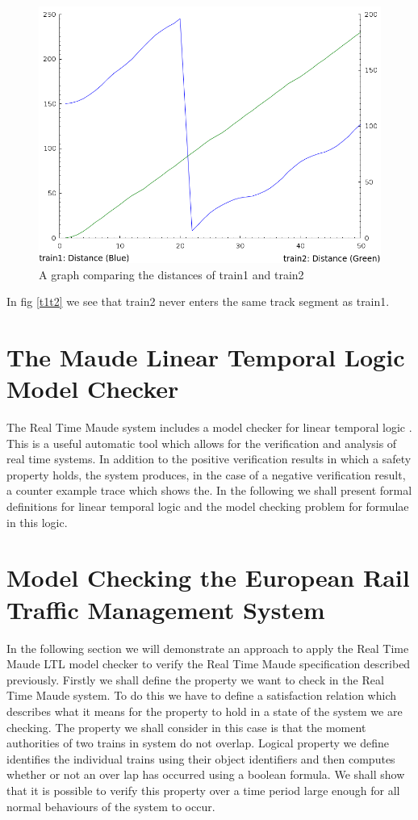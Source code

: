 \begin{figure}
\label{t1t2graph}
\begin{center}
\includegraphics[scale=0.64]{t1t2graph.png}
\end{center}
\caption{A graph comparing the distances of train1 and train2}
\end{figure}

In fig \ref{t1t2} we see that train2 never enters the same track segment as train1.

\section{The Maude Linear Temporal Logic Model Checker}
The Real Time Maude system includes a model checker for linear temporal logic \cite{ES00}.  This is a useful automatic tool which allows for the verification and analysis of real time systems. In addition to the positive verification results in which a safety property holds,  the system produces, in the case of a negative verification result, a counter example trace which shows the. In the following we shall present formal definitions for linear temporal logic and the model checking problem for formulae in this logic.

 

\section{Model Checking the European Rail Traffic Management System}
In the following section we will demonstrate an approach to apply the Real Time Maude LTL model checker to verify the Real Time Maude specification described previously.
Firstly we shall define the property we want to check in the Real Time Maude system. To do this we have to define a satisfaction relation which describes what it means for the property to hold in a state of the system we are checking.  The property we shall consider in this case is that the moment authorities of two trains in system do not overlap. Logical property we define identifies the individual trains using their object identifiers and then computes whether or not an over lap has occurred using a boolean formula.  We shall show that it is possible to verify this property over a time period large enough for all normal behaviours of the system to occur. 

